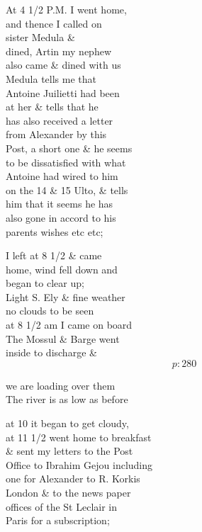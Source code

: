 \documentclass{report}
\begin{document}
	\par{
 	At 4 1/2 P.M. I went home,\ \\and thence I called on\ \\sister Medula \&\ \\dined, Artin my nephew\ \\also came \& dined with us\ \\Medula tells me that\ \\Antoine Juilietti had been\ \\at her \& tells that he\ \\has also received a letter\ \\from Alexander by this\ \\Post, a short one \& he seems\ \\to be dissatisfied with what\ \\Antoine had wired to him\ \\on the 14 \& 15 Ulto, \& tells\ \\him that it seems he has\ \\also gone in accord to his\ \\parents wishes etc etc;\ \\
	}

	\par{
 	I left at 8 1/2 \& came\ \\home, wind fell down and\ \\began to clear up;\ \\Light S. Ely \& fine weather\ \\no clouds to be seen\ \\at 8 1/2 am I came on board\ \\The Mossul \& Barge went\ \\inside to discharge \&\ \\
  \[p: 280 \]

	}

	\par{
 	we are loading over them\ \\The river is as low as before\ \\
	}

	\par{
 	at 10 it began to get cloudy,\ \\at 11 1/2 went home to breakfast\ \\\& sent my letters to the Post\ \\Office to Ibrahim Gejou including\ \\one for Alexander to R. Korkis\ \\London \& to the news paper\ \\offices of the St Leclair in\ \\Paris for a subscription;\ \\
	}
\end{document}
